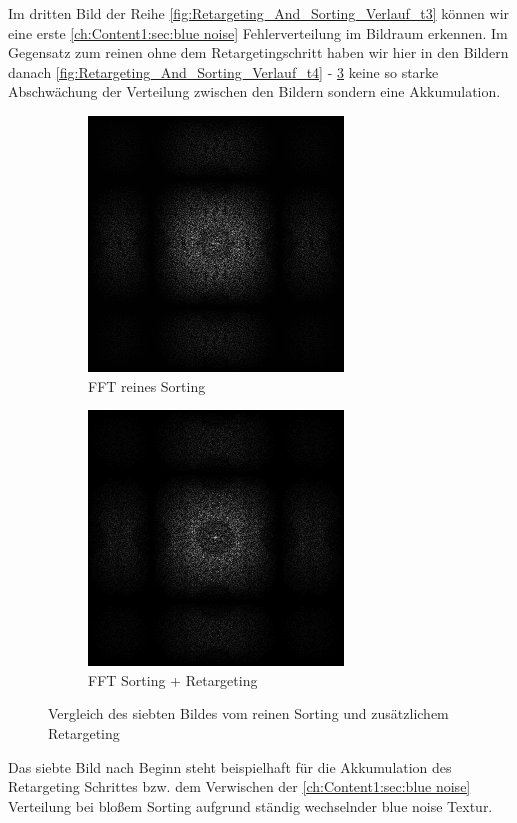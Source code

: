 Im dritten Bild der Reihe \ref{fig:Retargeting_And_Sorting_Verlauf_t3} können wir eine erste 
\ref{ch:Content1:sec:blue noise} Fehlerverteilung im Bildraum erkennen. Im Gegensatz zum 
reinen  ohne dem Retargetingschritt haben wir hier in den 
Bildern danach \ref{fig:Retargeting_And_Sorting_Verlauf_t4} - \ref{fig:Retargeting_And_Sorting_Verlauf_t7}
keine so starke Abschwächung der Verteilung zwischen den Bildern sondern eine Akkumulation.

\begin{figure}[H]
    \begin{subfigure}{0.5\textwidth}
        \centering\includegraphics[width=0.5\linewidth]{content/TemporalerAlg/Bilder/Sorting/Screenshots/Spektren/seed_debug_9.0_ausschnitt.png} 
        \caption{FFT reines Sorting}
        \label{fig:VergleichSorting}
    \end{subfigure}
    \begin{subfigure}{0.5\textwidth}
        \centering\includegraphics[width=0.5\linewidth]{content/TemporalerAlg/Bilder/Retargeting/Screenshots/Spektren/seed_debug_9.0_ausschnitt.png}
        \caption{FFT Sorting + Retargeting}
        \label{fig:VergleichRetargeting}
    \end{subfigure}
        \caption{Vergleich des siebten Bildes vom reinen Sorting und zusätzlichem Retargeting}
        \label{fig:Retargeting_And_Sorting_Verlauf_t7}
\end{figure}

Das siebte Bild nach Beginn steht beispielhaft für die Akkumulation des Retargeting Schrittes bzw. 
dem Verwischen der \ref{ch:Content1:sec:blue noise} Verteilung bei bloßem Sorting aufgrund ständig 
wechselnder blue noise Textur.